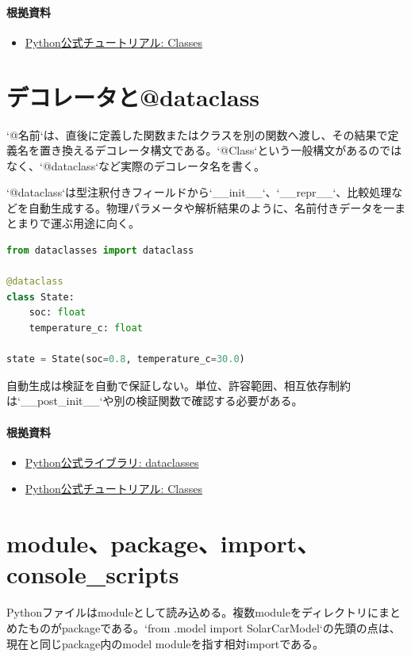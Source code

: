 \documentclass[a4paper,11pt]{article}
\begin{document}
\paragraph{根拠資料}
\begin{itemize}[leftmargin=1.6em]
\item \href{https://docs.python.org/3/tutorial/classes.html}{Python公式チュートリアル: Classes}
\end{itemize}

\section{デコレータと@dataclass}
`@名前`は、直後に定義した関数またはクラスを別の関数へ渡し、その結果で定義名を置き換えるデコレータ構文である。`@Class`という一般構文があるのではなく、`@dataclass`など実際のデコレータ名を書く。


`@dataclass`は型注釈付きフィールドから`\_\_init\_\_`、`\_\_repr\_\_`、比較処理などを自動生成する。物理パラメータや解析結果のように、名前付きデータを一まとまりで運ぶ用途に向く。


\begin{lstlisting}[language=python]
from dataclasses import dataclass

@dataclass
class State:
    soc: float
    temperature_c: float

state = State(soc=0.8, temperature_c=30.0)
\end{lstlisting}


自動生成は検証を自動で保証しない。単位、許容範囲、相互依存制約は`\_\_post\_init\_\_`や別の検証関数で確認する必要がある。

\paragraph{根拠資料}
\begin{itemize}[leftmargin=1.6em]
\item \href{https://docs.python.org/3/library/dataclasses.html}{Python公式ライブラリ: dataclasses}
\item \href{https://docs.python.org/3/tutorial/classes.html}{Python公式チュートリアル: Classes}
\end{itemize}

\section{module、package、import、console\_scripts}
Pythonファイルはmoduleとして読み込める。複数moduleをディレクトリにまとめたものがpackageである。`from .model import SolarCarModel`の先頭の点は、現在と同じpackage内のmodel moduleを指す相対importである。
\end{document}
